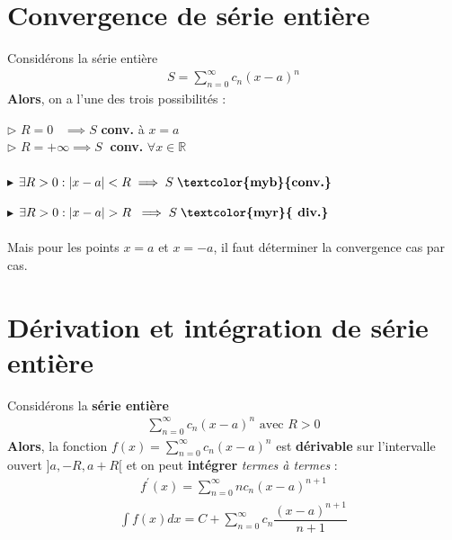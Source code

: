 \documentclass{report}
\begin{document}
\begin{multicols*}{3}
    \vspace{-1.5em}
    \section{Convergence de série entière}
    \vspace{-0.5em}
        Considérons la série entière 
        \begin{align*}
           S = \sum_{n=0}^{\infty }c_n(x - a)^n 
        \end{align*}
        \textbf{Alors}, on a l'une des trois possibilités : 

            \noindent$\rhd$
                $R = 0 \;\;\; \implies S$ \; 
                \textcolor{myb}{\textbf{conv.}}  à $x = a$ 
            \\
            $\rhd$  $R = +\infty \implies S \;$ 
            \textcolor{myb}{\textbf{conv.}} 
            \; $\forall x \in \mathbb{R}$  
            \\ \\
            $\blacktriangleright$ 
            $\exists R > 0 : |x - a| < R \implies  S \; \textbf{\textcolor{myb}{conv.}}$

            \noindent 
            $\blacktriangleright$ $\exists R > 0 : |x - a| > R \; \implies  S \;
            \textbf{\textcolor{myr}{ div.}}$   
            \\\\ 
            Mais pour les points $x = a$ et $x = -a$, il faut déterminer  
            la convergence cas par cas. 


    \vspace{-1em}
    \section{Dérivation et intégration de série entière}
    \vspace{-2em}
        Considérons la \textbf{série entière} 
        \begin{align*}
            \sum\limits_{n = 0}^{\infty}c_n(x - a)^n \text{ avec } R > 0
        \end{align*}                
        \textbf{Alors}, la fonction $f(x) =  \sum_{n=0}^{\infty }c_n(x - a)^n$ 
        est \textbf{\textcolor{myb}{dérivable}} 
        sur l'intervalle ouvert $]a, -R, a + R[$ et on peut 
        \textcolor{myb}{\textbf{intégrer}}    \textit{termes à termes} :  
        \begin{align*}
            f^{\prime}(x) = \sum_{n=0}^{\infty }nc_n(x - a)^{n + 1}
        \end{align*}
        \vspace{-1em} 
        \begin{align*}
            \int f(x)dx  = C + \sum_{n=0}^{\infty }c_n
            \dfrac{(x - a)^{n+1}}{n+1} 
        \end{align*}    




\end{multicols*}
\end{document}
